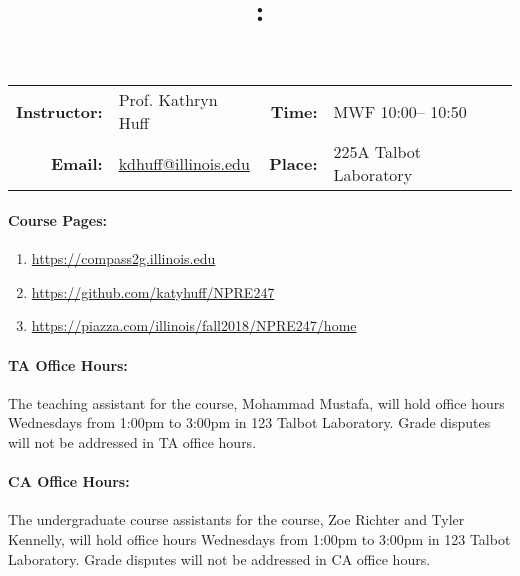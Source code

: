 \documentclass[11pt, a4paper]{article}
\title{\CourseNumber: \CourseTitle\\}
\author{\CourseUniversity}
\date{\CourseSemester \CourseYear}
\makeatletter
\newcommand{\CourseNumber}{NPRE247}
\newcommand{\CourseInstructor}{Prof. Kathryn Huff\xspace}%
\newcommand{\CourseDays}{MWF\xspace}%
\newcommand{\CourseStart}{10:00\xspace}%
\newcommand{\CourseEnd}{10:50\xspace}%
\newcommand{\CourseInstructorEmail}{kdhuff@illinois.edu}
\newcommand{\CourseRoom}{225A\xspace}%
\newcommand{\CourseBuilding}{Talbot Laboratory\xspace}%
\newcommand{\TeachingAssistant}{Mohammad Mustafa\xspace}%
\newcommand{\TAOfficeHourDays}{Wednesdays\xspace}%
\newcommand{\TAOfficeHourStart}{1:00pm\xspace}%
\newcommand{\TAOfficeHourEnd}{3:00pm\xspace}%
\newcommand{\TAOfficeHourPlace}{123 Talbot Laboratory\xspace}
\newcommand{\CourseAssistants}{Zoe Richter and Tyler Kennelly\xspace}%
\newcommand{\CAOfficeHourDays}{Wednesdays\xspace}%
\newcommand{\CAOfficeHourStart}{1:00pm\xspace}%
\newcommand{\CAOfficeHourEnd}{3:00pm\xspace}%
\newcommand{\CAOfficeHourPlace}{123 Talbot Laboratory\xspace}
\makeatother
\begin{document}
\maketitle
\renewcommand{\arraystretch}{1.5}
\begin{center}
\begin{table}[h]
\begin{tabularx}{\textwidth}{rXrX}
\hline
\textbf{Instructor:} & \CourseInstructor & \textbf{Time:} & \CourseDays \CourseStart -- \CourseEnd \\
\textbf{Email:} &  \href{mailto:\CourseInstructorEmail}{\CourseInstructorEmail} & \textbf{Place:} & \CourseRoom \CourseBuilding\\
\hline
\end{tabularx}
\end{table}
\end{center}

\paragraph{Course Pages:}
\begin{enumerate}
        \item \url{https://compass2g.illinois.edu}
        \item \url{https://github.com/katyhuff/\CourseNumber}
        \item \url{https://piazza.com/illinois/fall2018/\CourseNumber/home}
\end{enumerate}

\paragraph{TA Office Hours:} The teaching assistant for the course, 
\TeachingAssistant, will hold office hours \TAOfficeHourDays from 
\TAOfficeHourStart to \TAOfficeHourEnd in \TAOfficeHourPlace. 
Grade disputes will not be addressed in TA office hours. 

\paragraph{CA Office Hours:} The undergraduate course assistants for the course, 
\CourseAssistants, will hold office hours \CAOfficeHourDays from 
\CAOfficeHourStart to \CAOfficeHourEnd in \CAOfficeHourPlace.
Grade disputes will not be addressed in CA office hours. 
\end{document}
